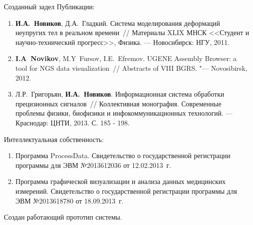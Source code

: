 \documentclass[usenames,dvipsnames,pdftex,unicode,hidelinks]{beamer}
\begin{document}
  \begin{frame}{Созданный задел}
    Публикации:
    {
      \scriptsize
      \begin{enumerate}
        \item
          \textbf{И.А.~Новиков}, Д.А.~Гладкий. Система моделирования деформаций неупругих тел в реальном времени~//
          Материалы XLIX МНСК <<Студент и научно-технический прогресс>>, Физика. --- Новосибирск:
          НГУ, 2011.
        \item
          \textbf{I.A~Novikov}, M.Y~Fursov, I.E.~Efremov. UGENE Assembly Browser: a tool for NGS data
          visualization~// Abstracts of VIII BGRS. "--- Novosibirsk, 2012.
        \item
          Л.Р.~Григорьян, \textbf{И.А.~Новиков}. Информационная система обработки прецизионных сигналов~//
          Коллективная монография. Современные проблемы физики, биофизики и инфокоммуникационных технологий.
          --- Краснодар: ЦНТИ, 2013. С. 185 - 198.
      \end{enumerate}
    }
    Интеллектуальная собственность:
    {
      \scriptsize
      \begin{enumerate}
        \item
          Программа ProcessData. Свидетельство о государственной регистрации программы
          для ЭВМ №2013612036 от 12.02.2013~г.
        \item
          Программа графической визуализации и анализа данных медицинских измерений.
          Свидетельство о государственной регистрации программы для ЭВМ №2013618780 от 18.09.2013~г.
      \end{enumerate}
    }
    Создан работающий прототип системы.
  \end{frame}
\end{document}
